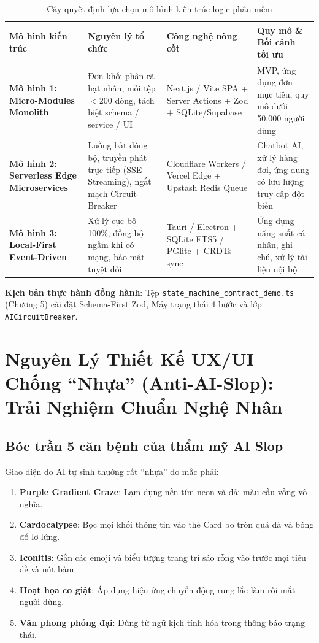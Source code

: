 \documentclass[a4paper,11pt]{report}
\begin{document}
\begin{table}[htbp]
\centering
\small
\caption{Cây quyết định lựa chọn mô hình kiến trúc logic phần mềm}
\vspace{0.5em}
\begin{tabularx}{\textwidth}{L{3.2cm} L{3.8cm} L{4.5cm} Y}
\toprule
\textbf{Mô hình kiến trúc} & \textbf{Nguyên lý tổ chức} & \textbf{Công nghệ nòng cốt} & \textbf{Quy mô \& Bối cảnh tối ưu} \\
\midrule
\textbf{Mô hình 1: Micro-Modules Monolith} & Đơn khối phân rã hạt nhân, mỗi tệp $< 200$ dòng, tách biệt schema / service / UI & Next.js / Vite SPA + Server Actions + Zod + SQLite/Supabase & MVP, ứng dụng đơn mục tiêu, quy mô dưới 50.000 người dùng \\
\textbf{Mô hình 2: Serverless Edge Microservices} & Luồng bất đồng bộ, truyền phát trực tiếp (SSE Streaming), ngắt mạch Circuit Breaker & Cloudflare Workers / Vercel Edge + Upstash Redis Queue & Chatbot AI, xử lý hàng đợi, ứng dụng có lưu lượng truy cập đột biến \\
\textbf{Mô hình 3: Local-First Event-Driven} & Xử lý cục bộ 100\%, đồng bộ ngầm khi có mạng, bảo mật tuyệt đối & Tauri / Electron + SQLite FTS5 / PGlite + CRDTs sync & Ứng dụng năng suất cá nhân, ghi chú, xử lý tài liệu nội bộ \\
\bottomrule
\end{tabularx}
\end{table}

\noindent\textbf{Kịch bản thực hành đồng hành}: Tệp \texttt{state\_machine\_contract\_demo.ts} (Chương 5) cài đặt Schema-First Zod, Máy trạng thái 4 bước và lớp \texttt{AICircuitBreaker}.

\chapter{Nguyên Lý Thiết Kế UX/UI Chống ``Nhựa'' (Anti-AI-Slop): Trải Nghiệm Chuẩn Nghệ Nhân}

\section{Bóc trần 5 căn bệnh của thẩm mỹ AI Slop}
Giao diện do AI tự sinh thường rất ``nhựa'' do mắc phải:
\begin{enumerate}[label={\arabic*.}]
    \item \textbf{Purple Gradient Craze}: Lạm dụng nền tím neon và dải màu cầu vồng vô nghĩa.
    \item \textbf{Cardocalypse}: Bọc mọi khối thông tin vào thẻ Card bo tròn quá đà và bóng đổ lơ lửng.
    \item \textbf{Iconitis}: Gắn các emoji và biểu tượng trang trí sáo rỗng vào trước mọi tiêu đề và nút bấm.
    \item \textbf{Hoạt họa co giật}: Áp dụng hiệu ứng chuyển động rung lắc làm rối mắt người dùng.
    \item \textbf{Văn phong phóng đại}: Dùng từ ngữ kịch tính hóa trong thông báo trạng thái.
\end{enumerate}
\end{document}
